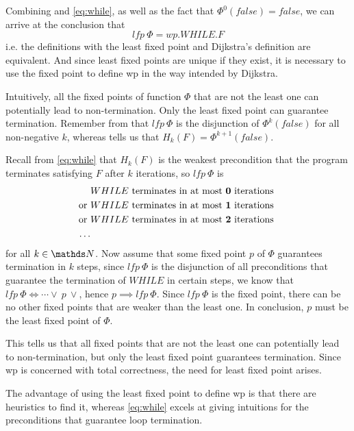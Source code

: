 Combining  and \autoref{eq:while}, as well as the fact that $\Phi^0(false)=false$, we can arrive at the conclusion that 
$$lfp\ \Phi = wp.WHILE.F$$
i.e. the definitions with the least fixed point and Dijkstra's definition are equivalent.
And since least fixed points are unique if they exist, it is necessary to use the  fixed point to define wp in the way intended by Dijkstra. 

Intuitively, all the fixed points of function $\Phi$ that are not the least one can potentially lead to non-termination. 
Only the least fixed point can guarantee termination. 
Remember from  that $lfp \ \Phi$ is the disjunction of $\Phi^{k}(false)$ for all non-negative $k$, whereas  tells us that $H_k(F)=\Phi^{k+1}(false)$.

Recall from \autoref{eq:while} that $H_k(F)$ is the weakest precondition that the program terminates satisfying $F$ after  $k$ iterations, so $lfp\ \Phi$ is 
\begin{align*}
  & WHILE \text{ terminates in at most \textbf{0} iterations }\\
  \text{or } & WHILE \text{ terminates in at most \textbf{1} iterations} \\
  \text{or } & WHILE \text{ terminates in at most \textbf{2} iterations} \\
  \dots
\end{align*}
for all $k\in\N$. 
Now assume that some fixed point $p$ of $\Phi$ guarantees termination in $k$ steps, since $lfp\ \Phi$ is the disjunction of all preconditions that guarantee the termination of $WHILE$ in certain steps, we know that $lfp\ \Phi \Leftrightarrow \cdots\vee\ p\ \vee$, hence $p\implies lfp\ \Phi$. 
Since $lfp \ \Phi$ is the  fixed point, there can be no other fixed points that are weaker than the least one. 
In conclusion, $p$ must be the least fixed point of $\Phi$. 

This tells us that all fixed points that are not the least one can potentially lead to non-termination, but only the least fixed point guarantees termination. 
Since wp is concerned with total correctness, the need for least fixed point arises. 

The advantage of using the least fixed point to define wp is that there are heuristics to find it, whereas \autoref{eq:while} excels at giving intuitions for the preconditions that guarantee loop termination. 

